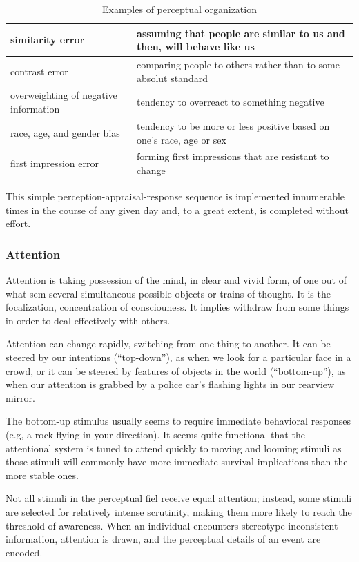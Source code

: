 \documentclass[12pt,article,oneside,a4paper]{memoir}
\begin{document}
\begin{table}
  \begin{tabular}{ p{5cm} |  p{10cm} }
    \hline
    similarity error & assuming that people are similar to us and then, will behave like us \\ \hline
    contrast error & comparing people to others rather than to some absolut standard \\ \hline
    overweighting of negative information & tendency to overreact to something negative \\ \hline
    race, age, and gender bias & tendency to be more or less positive based on one's race, age or sex \\ \hline
	first impression error & forming first impressions that are resistant to change \\ 
    \hline
  \end{tabular}
  \caption{Examples of perceptual organization}
  \label{table:accuracy-judgment}
\end{table}

This simple perception-appraisal-response sequence is implemented innumerable times in the course of any given day and, to a great extent, is completed without effort.

\subsubsection{Attention}
Attention is taking possession of the mind, in clear and vivid form, of one out of what sem several simultaneous possible objects or trains of thought. It is the focalization, concentration of consciouness. It implies withdraw from some things in order to deal effectively with others.

Attention can change rapidly, switching from one thing to another. It can be steered by our intentions (``top-down''), as when we look for a particular face in a crowd, or it
can be steered by features of objects in the world (``bottom-up''), as when our attention is grabbed by a police car's flashing lights in our rearview mirror.

The bottom-up stimulus usually seems to require immediate behavioral responses (e.g, a rock flying in your direction). It seems quite functional that the attentional system is tuned to attend quickly to moving and looming stimuli as those stimuli will commonly have more immediate survival implications than the more stable ones.

Not all stimuli in the perceptual fiel receive equal attention; instead, some stimuli are selected for relatively intense scrutinity, making them more likely to reach the threshold of awareness. When an individual encounters stereotype-inconsistent information, attention is drawn, and the perceptual details of an event are encoded.
\end{document}
